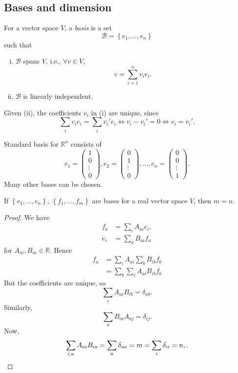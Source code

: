 \documentclass[a4paper]{article}
\begin{document}
\subsection{Bases and dimension}
\begin{definition}
  For a vector space $V$, a \textit{basis} is a set
  \[
    \mathcal{B}= \left\{ e_1,\dots, e_n\right\}
  \]
  such that
  \begin{enumerate}[(i)]
    \item $ \mathcal{B} $ spans $V$. i.e., $ \forall v\in V $,
      \[
        v = \sum_{i=1}^{n}v_i e_i
      .\]
    \item $ \mathcal{B} $ is linearly independent.
  \end{enumerate}
  Given (ii), the coefficients $v_i$ in (i) are unique, since
  \[
    \sum_{i}v_ie_i=\sum_{i}v_i'e_i \Longleftrightarrow v_i-v_i'=0
    \Longleftrightarrow v_i=v_i'
  .\]
\end{definition}
\begin{example}
  Standard basis for $ \mathbb{R}^n $ consists of
  \[
    e_1=
    \begin{pmatrix}
      1\\
      0\\
      \vdots\\
      0
    \end{pmatrix},
    e_2 =
    \begin{pmatrix}
      0\\
      1\\
      \vdots\\
      0
    \end{pmatrix},
    \dots,
    e_n=
    \begin{pmatrix}
      0\\
      0\\
      \vdots\\
      1
    \end{pmatrix}
  .\]
  Many other bases can be chosen.
\end{example}
\begin{theorem}\label{thm:dimension}
  If $ \left\{ e_1,\dots,e_n\right\} $, $ \left\{
  f_1,\dots,f_m\right\} $ are bases for a real vector space $V$, then $m=n$.
\end{theorem}
\begin{proof}
  We have
  \[
    \begin{aligned}
      f_a&= \sum_{i}A_{ai}e_i,\\
      e_i&= \sum_{a}B_{ia}f_a
    \end{aligned}
  \]
  for $ A_{ai},B_{ia}\in \mathbb{R} $.
  Hence
  \[
    \begin{aligned}
      f_a&=\sum_{i}A_{ai}\sum_{b}B_{ib}f_{b}\\
      &= \sum_{b}\sum_{i}A_{ai}B_{ib}f_b
    \end{aligned}
  \]
  But the coefficients are unique, so
  \[
    \sum_{i}A_{ai}B_{ib}=\delta_{ab}
  .\]
  Similarly,
  \[
    \sum_{a}B_{ia}A_{aj}=\delta_{ij}
  .\]
  Now,
  \[
    \sum_{i,a}A_{ai}B_{ia}=\sum_{a} \delta_{aa}=m = \sum_{i}\delta_{ii}=n,\\
  .\]
\end{proof}
\end{document}
